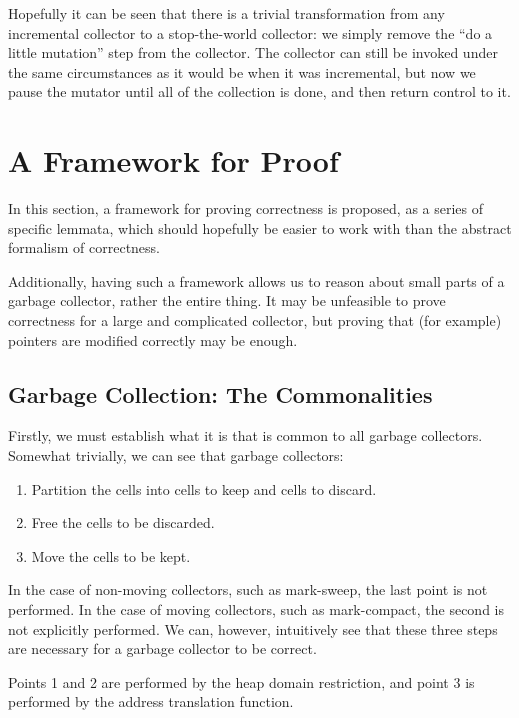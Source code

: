 Hopefully it can be seen that there is a trivial transformation from
any \gls{incremental collector} to a stop-the-world \gls{collector}:
we simply remove the ``do a little mutation'' step from the
collector. The collector can still be invoked under the same
circumstances as it would be when it was incremental, but now we pause
the \gls{mutator} until all of the collection is done, and then return
control to it.

\section{A Framework for Proof}

In this section, a framework for proving correctness is proposed, as a
series of specific lemmata, which should hopefully be easier to work
with than the abstract formalism of correctness.

Additionally, having such a framework allows us to reason about small
parts of a \gls{garbage collector}, rather the entire thing. It may be
unfeasible to prove correctness for a large and complicated
\gls{collector}, but proving that (for example) \glspl{pointer} are
modified correctly may be enough.

\subsection{Garbage Collection: The Commonalities}

Firstly, we must establish what it is that is common to all
\glspl{garbage collector}. Somewhat trivially, we can see that
\glspl{garbage collector}:

\begin{enumerate}
  \item Partition the \glspl{cell} into cells to keep and cells to
    discard.
  \item Free the cells to be discarded.
  \item Move the cells to be kept.
\end{enumerate}

In the case of non-moving collectors, such as mark-sweep, the last
point is not performed. In the case of moving collectors, such as
mark-compact, the second is not explicitly performed. We can, however,
intuitively see that these three steps are necessary for a garbage
collector to be correct.

Points 1 and 2 are performed by the \gls{heap} domain restriction, and
point 3 is performed by the address translation function.

